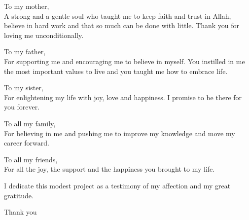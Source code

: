 
\begin{dedication} 

    \begin{flushleft}
    To my mother,\\
    A strong and a gentle soul who taught me to keep faith and trust in Allah, believe 
    in hard work and that so much can be done with little.
    Thank you for loving me unconditionally.

    \vspace{20px}

    To my father,\\
    For supporting me and encouraging me to believe in myself. You instilled in me the most
    important values to live and you taught me how to embrace life.
    
    \vspace{20px}

    To my sister,\\
    For enlightening my life with joy, love and happiness. I promise to be there for you
    forever.
    
    \vspace{20px}

    To all my family,\\
    For believing in me and pushing me to improve my knowledge and move my career forward.
    
    \vspace{20px}

    To all my friends,\\
    For all the joy, the support and the happiness you brought to my life.
    
    \vspace{20px}

    I dedicate this modest project as a testimony of my affection and my great gratitude.    
    
    Thank you

\end{flushleft}

\end{dedication}

